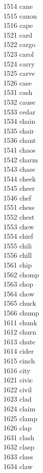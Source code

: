 1514 cane \\
1515 canon \\
1516 cape \\
1521 card \\
1522 cargo \\
1523 carol \\
1524 carry \\
1525 carve \\
1526 case \\
1531 cash \\
1532 cause \\
1533 cedar \\
1534 chain \\
1535 chair \\
1536 chant \\
1541 chaos \\
1542 charm \\
1543 chase \\
1544 cheek \\
1545 cheer \\
1546 chef \\
1551 chess \\
1552 chest \\
1553 chew \\
1554 chief \\
1555 chili \\
1556 chill \\
1561 chip \\
1562 chomp \\
1563 chop \\
1564 chow \\
1565 chuck \\
1566 chump \\
1611 chunk \\
1612 churn \\
1613 chute \\
1614 cider \\
1615 cinch \\
1616 city \\
1621 civic \\
1622 civil \\
1623 clad \\
1624 claim \\
1625 clamp \\
1626 clap \\
1631 clash \\
1632 clasp \\
1633 class \\
1634 claw \\
